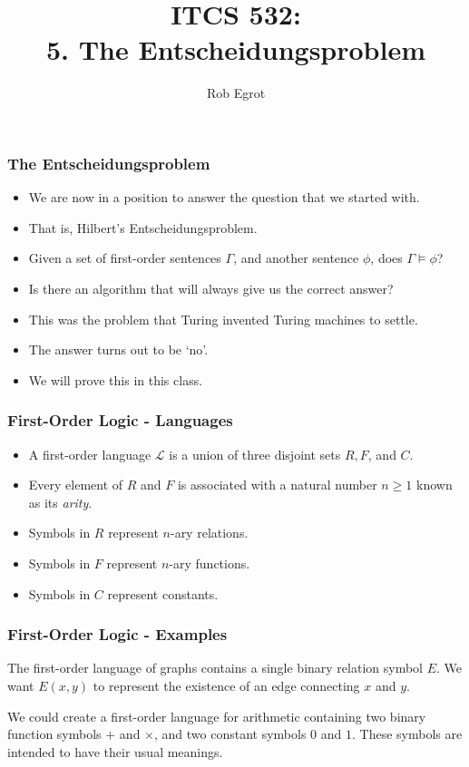 \documentclass[handout]{beamer}
\title{ITCS 532:\\ 
5. The Entscheidungsproblem}
\date{}
\author{Rob Egrot}
\begin{document}
\begin{frame}
\titlepage
\end{frame}

\begin{frame}
\frametitle{The Entscheidungsproblem}
\begin{itemize}
\item We are now in a position to answer the question that we started with.
\vspace{0.3cm}
\item That is, Hilbert's Entscheidungsproblem.
\vspace{0.3cm}
\item Given a set of first-order sentences $\Gamma$, and another sentence $\phi$, does $\Gamma\models \phi$?
\vspace{0.3cm}
\item Is there an algorithm that will always give us the correct answer?
\vspace{0.3cm}
\item This was the problem that Turing invented Turing machines to settle.
\vspace{0.3cm}
\item The answer turns out to be `no'.
\vspace{0.3cm}
\item We will prove this in this class. 
\end{itemize}
\end{frame}

\begin{frame}
\frametitle{First-Order Logic - Languages}
\begin{definition}
\begin{itemize}
\item A first-order language $\mathscr{L}$ is a union of three disjoint sets $R,F$, and $C$. 
\item Every element of $R$ and $F$ is associated with a natural number $n\geq 1$ known as its \emph{arity}. 
\item Symbols in $R$ represent $n$-ary relations. 
\item Symbols in $F$ represent $n$-ary functions. 
\item Symbols in $C$ represent constants. 
\end{itemize}
\end{definition} 
\end{frame}

\begin{frame}
\frametitle{First-Order Logic - Examples}
\begin{example}[graphs]
The first-order language of graphs contains a single binary relation symbol $E$. We want $E(x,y)$ to represent the existence of an edge connecting $x$ and $y$.
\end{example}
\vspace{1cm}
\begin{example}[arithmetic]
We could create a first-order language for arithmetic containing two binary function symbols $+$ and $\times$, and two constant symbols $0$ and $1$. These symbols are intended to have their usual meanings.
\end{example}
\end{frame}
\end{document}
